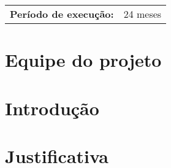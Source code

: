 \begin{table}[!th]
\begin{tabular}{l p{}}
\textbf{Período de execução:}  & 24 meses\\
\end{tabular}
\end{table}
\newpage



%
\section{Equipe do projeto}
\label{sec:equip}
%

\section{Introdução}
\label{sec:intro}
%

\section{Justificativa}
\label{sec:just}
%

